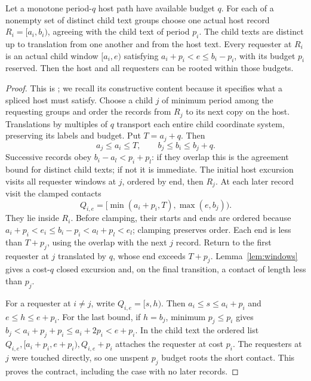\begin{lemma}\label{lem:host}
Let a monotone period-$q$ host path have available budget $q$.
For each of a nonempty set of distinct child text groups choose one
actual host record $R_i=[a_i,b_i)$, agreeing with the child text of
period $p_i$. The child texts are distinct up to translation from one
another and from the host text. Every requester at $R_i$ is an actual
child window $[a_i,e)$ satisfying
$a_i+p_i<e\le b_i-p_i$, with its budget $p_i$ reserved.
Then the host and all requesters can be rooted within those budgets.
\end{lemma}
\begin{proof}
This is ; we recall its constructive content
because it specifies what a spliced host must satisfy. Choose a child
$j$ of minimum period among the requesting groups and order the records
from $R_j$ to its next copy on the host. Translations by multiples of
$q$ transport each entire child coordinate system, preserving its labels
and budget. Put $T=a_j+q$. Then
\[
a_j\le a_i\le T,\qquad b_j\le b_i\le b_j+q.
\]
Successive records obey $b_i-a_l<p_i+p_l$: if they overlap this is
the agreement bound for distinct child texts; if not it is immediate.
The initial host excursion visits all requester windows at $j$, ordered
by end, then $R_j$. At each later record visit the clamped contacts
\begin{equation}\label{eq:clamp}
Q_{i,e}=[\min(a_i+p_i,T),\max(e,b_j)).
\end{equation}
They lie inside $R_i$. Before clamping, their starts and ends are ordered
because $a_i+p_i<e_i\le b_i-p_i<a_l+p_l<e_l$;
clamping preserves order. Each end is less than $T+p_j$, using the
overlap with the next $j$ record. Return to the first requester at $j$
translated by $q$, whose end exceeds $T+p_j$.
Lemma~\ref{lem:windows} gives a cost-$q$ closed excursion and, on the final
transition, a contact of length less than $p_j$.

For a requester at $i\ne j$, write $Q_{i,e}=[s,h)$. Then
$a_i\le s\le a_i+p_i$ and $e\le h\le e+p_i$.
For the last bound, if $h=b_j$, minimum $p_j\le p_i$ gives
$b_j<a_i+p_j+p_i\le a_i+2p_i<e+p_i$.
In the child text the ordered list
$Q_{i,e},[a_i+p_i,e+p_i),Q_{i,e}+p_i$
attaches the requester at cost $p_i$. The requesters at $j$ were touched
directly, so one unspent $p_j$ budget roots the short contact.
This proves the contract, including the case with no later records.
\end{proof}
